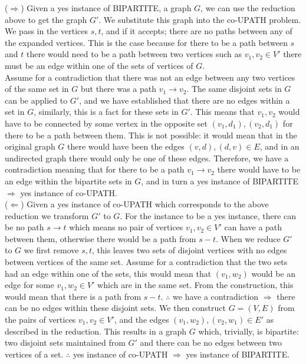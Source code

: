 \documentclass[12pt]{article}
\begin{document}
\begin{enumerate}
\begin{enumerate}
($\Rightarrow $) Given a yes instance of BIPARTITE, a graph $G$, we can use the reduction above to get the graph $G'$. We substitute this graph into the co-UPATH problem. We pass in the vertices $s,t$, and if it accepts; there are no paths between any of the expanded vertices. This is the case because for there to be a path between $s$ and $t$ there would need to be a path between two vertices such as $v_1,v_2 \in V'$ there must be an edge within one of the sets of vertices of $G$. \\Assume for a contradiction that there was not an edge between any two vertices of the same set in $G$ but there was a path $v_1\rightarrow v_2$. The same disjoint sets in $G$ can be applied to $G'$, and we have established that there are no edges within a set in $G$, similarly, this is a fact for these sets in $G'$. This means that $v_1,v_2$ would have to be connected by some vertex in the opposite set $(v_1,d_1),(v_2,d_1)$ for there to be a path between them. This is not possible: it would mean that in the original graph $G$ there would have been the edges $(v,d),(d,v)\in E$, and in an undirected graph there would only be one of these edges. Therefore, we have a contradiction meaning that for there to be a path $v_1\rightarrow v_2$ there would have to be an edge within the bipartite sets in $G$, and in turn a yes instance of BIPARTITE $\Rightarrow $ yes instance of co-UPATH. \\
($\Leftarrow $) Given a yes instance of co-UPATH which corresponds to the above reduction we transform $G'$ to $G$. For the instance to be a yes instance, there can be no path $s\rightarrow t$ which means no pair of vertices $v_1,v_2 \in V'$ can have a path between them, otherwise there would be a path from $s-t$. When we reduce $G'$ to $G$ we first remove $s,t$, this leaves two sets of disjoint vertices with no edges between vertices of the same set. Assume for a contradiction that the two sets had an edge within one of the sets, this would mean that $(v_1,w_2)$ would be an edge for some $v_1,w_2 \in V'$ which are in the same set. From the construction, this would mean that there is a path from $s-t$. $\therefore $ we have a contradiction $\Rightarrow $ there can be no edges within these disjoint sets. We then construct $G=(V,E) $ from the pairs of vertices $v_1,v_2 \in V'$, and the edges $(v_1,w_2),(v_2,w_1) \in E'$ as described in the reduction. This results in a graph $G$ which, trivially, is bipartite: two disjoint sets maintained from $G'$ and there can be no edges between two vertices of a set. $\therefore $ yes instance of co-UPATH $\Rightarrow $ yes instance of BIPARTITE. \\

\end{enumerate}
\end{enumerate}
\end{document}

